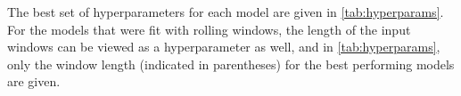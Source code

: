 The best set of hyperparameters for each model are given in \cref{tab:hyperparams}. For the models that were fit with rolling windows, the length of the input windows can be viewed as a hyperparameter as well, and in \cref{tab:hyperparams}, only the window length (indicated in parentheses) for the best performing models are given. 


